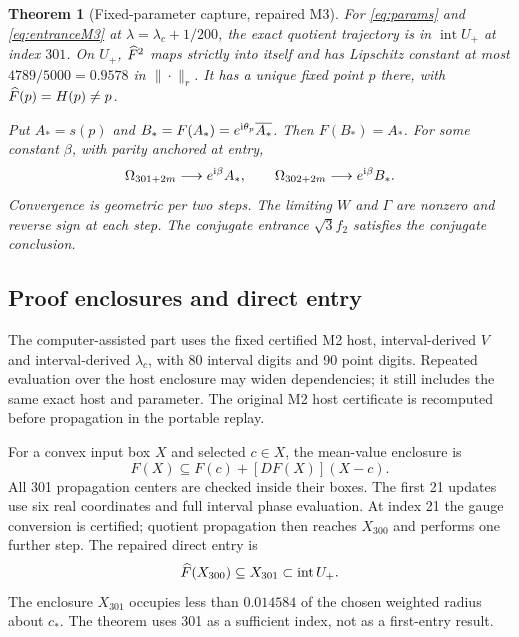 \documentclass[11pt,a4paper]{article}
\newtheorem{theorem}{Theorem}\newtheorem{proposition}[theorem]{Proposition}\newtheorem{lemma}[theorem]{Lemma}
\begin{document}
\begin{theorem}[Fixed-parameter capture, repaired M3]\label{thm:M3}
For \eqref{eq:params} and \eqref{eq:entranceM3} at $\lambda=\lambda_c+1/200$, the exact quotient trajectory is in $\operatorname{int}U_+$ at index $301$. On $U_+$, $\widehat F^2$ maps strictly into itself and has Lipschitz constant at most $4789/5000=0.9578$ in $\|\cdot\|_r$. It has a unique fixed point $p$ there, with $\widehat F(p)=H(p)\ne p$.

Put $A_*=s(p)$ and $B_*=F(A_*)=e^{\mathrm i\theta_p}\overline{A_*}$. Then $F(B_*)=A_*$. For some constant $\beta$, with parity anchored at entry,
\begin{equation}
 \Omega_{301+2m}\longrightarrow e^{\mathrm i\beta}A_*,\qquad
 \Omega_{302+2m}\longrightarrow e^{\mathrm i\beta}B_*.
\label{eq:fulllimit}
\end{equation}
Convergence is geometric per two steps. The limiting $W$ and $\Gamma$ are nonzero and reverse sign at each step. The conjugate entrance $\sqrt3f_2$ satisfies the conjugate conclusion.
\end{theorem}

\subsection{Proof enclosures and direct entry}
The computer-assisted part uses the fixed certified M2 host, interval-derived $V$ and interval-derived $\lambda_c$, with 80 interval digits and 90 point digits. Repeated evaluation over the host enclosure may widen dependencies; it still includes the same exact host and parameter. The original M2 host certificate is recomputed before propagation in the portable replay.

For a convex input box $X$ and selected $c\in X$, the mean-value enclosure is
\begin{equation}
 F(X)\subseteq F(c)+[DF(X)](X-c).\label{eq:meanvalue}
\end{equation}
All 301 propagation centers are checked inside their boxes. The first 21 updates use six real coordinates and full interval phase evaluation. At index 21 the gauge conversion is certified; quotient propagation then reaches $X_{300}$ and performs one further step. The repaired direct entry is
\begin{equation}
 \widehat F(X_{300})\subseteq X_{301}\subset\operatorname{int}U_+.\label{eq:entry}
\end{equation}
The enclosure $X_{301}$ occupies less than $0.014584$ of the chosen weighted radius about $c_*$. The theorem uses 301 as a sufficient index, not as a first-entry result.
\end{document}
